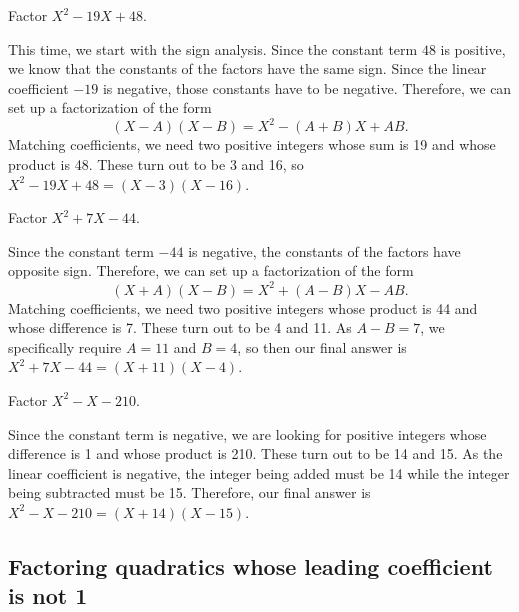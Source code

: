 \begin{example}
Factor $X^2 - 19X + 48$.
\end{example}
\begin{solution}
This time, we start with the sign analysis. Since the constant term $48$ is positive, we know that the constants of the factors have the same sign. Since the linear coefficient $-19$ is negative, those constants have to be negative. Therefore, we can set up a factorization of the form
\begin{equation*}
(X - A)(X - B) = X^2 - (A + B)X + AB.
\end{equation*}
Matching coefficients, we need two positive integers whose sum is 19 and whose product is 48. These turn out to be 3 and 16, so $X^2 - 19X + 48 = \boxed{(X - 3)(X - 16)}$.
\end{solution}

\begin{example}
Factor $X^2 + 7X - 44$.
\end{example}
\begin{solution}
Since the constant term $-44$ is negative, the constants of the factors have opposite sign. Therefore, we can set up a factorization of the form
\begin{equation*}
(X + A)(X - B) = X^2 + (A - B)X - AB.
\end{equation*}
Matching coefficients, we need two positive integers whose product is 44 and whose difference is 7. These turn out to be 4 and 11. As $A - B = 7$, we specifically require $A = 11$ and $B = 4$, so then our final answer is $X^2 + 7X - 44 = \boxed{(X + 11)(X - 4)}$.
\end{solution}

\begin{example}
Factor $X^2 - X - 210$.
\end{example}
\begin{solution}
Since the constant term is negative, we are looking for positive integers whose difference is 1 and whose product is 210. These turn out to be 14 and 15. As the linear coefficient is negative, the integer being added must be 14 while the integer being subtracted must be 15. Therefore, our final answer is $X^2 - X - 210 = \boxed{(X + 14)(X - 15)}$.
\end{solution}


\subsection{Factoring quadratics whose leading coefficient is not 1}


